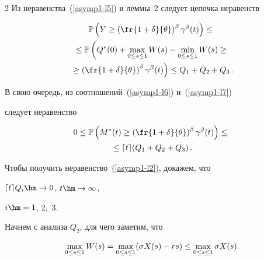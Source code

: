 \begin{multicols}{2}
 Из неравенства~(\ref{asymp1-l5}) и леммы~2 следует цепочка неравенств


\begin{multline}


\mathbb{P} \left( Y \geq \left( \fr{1+\delta}{\theta}


\right)^\beta\gamma^\beta(t)\right)\leq{}\\


{}\leq \mathbb{P} \left( Q^*(0)+\max\limits_{0 \leq s \leq 1}W(s)-\min\limits_{0 \leq s


\leq 1}W(s)  \geq{}\right.\\


\left.{}\geq \left( \fr{1+\delta}{\theta}


\right)^\beta\gamma^\beta(t)\right)


\leq Q_1+Q_2+Q_3\,.\label{asymp1-l7}


\end{multline}


В свою очередь, из соотношений~(\ref{asymp1-l6}) и~(\ref{asymp1-l7})


следует неравенство


\begin{multline*}


0 \leq \mathbb{P}\left(M^*(t) \geq \left( \fr{1+\delta}{\theta}


\right)^\beta \gamma^\beta(t)  \right) \leq{}\\


{}\leq \lceil t \rceil


(Q_1+Q_2+Q_3)\,.


\end{multline*}


Чтобы получить неравенство~(\ref{asymp1-l2}), докажем, что


 $\lceil t \rceil Q_i \hm\to 0$, $t \hm\to \infty$,


$i\hm=1$, 2,~3.





\pagebreak





 Начнем с анализа $Q_2$, для чего заметим, что


\begin{equation}


\hspace*{-1mm}\max\limits_{0 \leq s \leq 1}W(s)=\max\limits_{0 \leq s \leq 1}(\sigma X(s)-rs)


\leq \max\limits_{0 \leq s \leq 1}\sigma X(s). \!\!



\end{equation}
\end{multicols}
